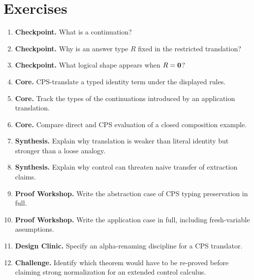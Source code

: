 \section*{Exercises}
\begin{enumerate}[label=\textbf{9.\arabic*.}]
\item \textbf{Checkpoint.} What is a continuation?
\item \textbf{Checkpoint.} Why is an answer type $R$ fixed in the restricted translation?
\item \textbf{Checkpoint.} What logical shape appears when $R=\mathbf{0}$?
\item \textbf{Core.} CPS-translate a typed identity term under the displayed rules.
\item \textbf{Core.} Track the types of the continuations introduced by an application translation.
\item \textbf{Core.} Compare direct and CPS evaluation of a closed composition example.
\item \textbf{Synthesis.} Explain why translation is weaker than literal identity but stronger than a loose analogy.
\item \textbf{Synthesis.} Explain why control can threaten naive transfer of extraction claims.
\item \textbf{Proof Workshop.} Write the abstraction case of CPS typing preservation in full.
\item \textbf{Proof Workshop.} Write the application case in full, including fresh-variable assumptions.
\item \textbf{Design Clinic.} Specify an alpha-renaming discipline for a CPS translator.
\item \textbf{Challenge.} Identify which theorem would have to be re-proved before claiming strong normalization for an extended control calculus.
\end{enumerate}
